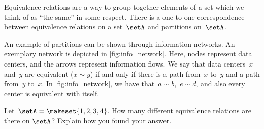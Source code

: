 \begin{remark}
    Equivalence relations are a way to group together elements of a set which we think of as ``the same'' in some respect.
    There is a one-to-one correspondence between equivalence relations on a set~$\setA$ and partitions on~$\setA$.
\end{remark}

\begin{marginfigure}
    \centering
    \caption{
        \label{fig:info_network}
    }
\end{marginfigure}

\begin{example}
    An example of partitions can be shown through information networks.
    An exemplary network is depicted in \cref{fig:info_network}.
    Here, nodes represent data centers, and the arrows represent information flows.
    We say that data centers~$x$ and~$y$ are equivalent ($x\sim y$) if and only if there is a path from~$x$ to~$y$ and a path from~$y$ to~$x$.
    In \cref{fig:info_network}, we have that~$a\sim b$,~$e\sim d$, and also every center is equivalent with itself.
\end{example}

\vfill
\begin{gradedexercise}
    \label{ex:CountingEquivalenceRelations}
    Let~$\setA = \makeset{ 1, 2, 3, 4 }$.
    How many different equivalence relations are there on $\setA$?
    Explain how you found your answer.
\end{gradedexercise}

